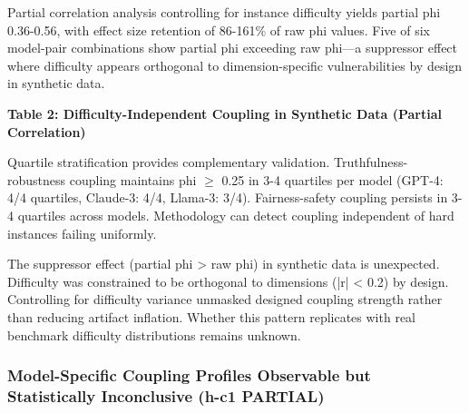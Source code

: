 Partial correlation analysis controlling for instance difficulty yields partial phi 0.36-0.56, with effect size retention of 86-161\% of raw phi values. Five of six model-pair combinations show partial phi exceeding raw phi---a suppressor effect where difficulty appears orthogonal to dimension-specific vulnerabilities by design in synthetic data.

\textbf{Table 2: Difficulty-Independent Coupling in Synthetic Data (Partial Correlation)}

\begin{table}[htbp]
\centering
{}
\end{table}

Quartile stratification provides complementary validation. Truthfulness-robustness coupling maintains phi $\geq$ 0.25 in 3-4 quartiles per model (GPT-4: 4/4 quartiles, Claude-3: 4/4, Llama-3: 3/4). Fairness-safety coupling persists in 3-4 quartiles across models. Methodology can detect coupling independent of hard instances failing uniformly.

The suppressor effect (partial phi > raw phi) in synthetic data is unexpected. Difficulty was constrained to be orthogonal to dimensions (|r| < 0.2) by design. Controlling for difficulty variance unmasked designed coupling strength rather than reducing artifact inflation. Whether this pattern replicates with real benchmark difficulty distributions remains unknown.

\subsubsection{Model-Specific Coupling Profiles Observable but Statistically Inconclusive (h-c1 PARTIAL)}


